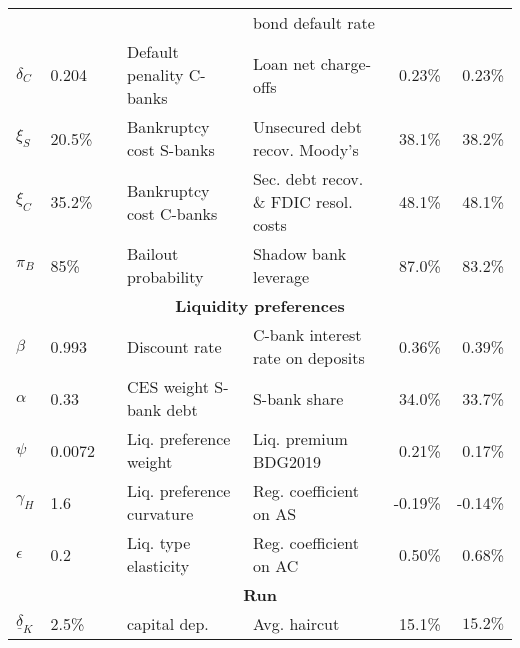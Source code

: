 \documentclass[letterpaper,12pt,dvipsnames,usenames]{article}
\theoremstyle{plain}
\begin{document}
\begin{table}[!ht]
{\begin{threeparttable}
\begin{tabular}{lllllrr}
				&  &    & &   bond default rate &   & \\
				$\delta_C$ & 0.204   &    &  Default penality C-banks  & Loan net charge-offs & 0.23\% &0.23\% \\
				$\xi_S$   & 20.5\%   &     & Bankruptcy cost S-banks  & Unsecured debt recov. Moody's & 38.1\%  & 38.2\% \\
				$\xi_C$   & 35.2\%    &    & Bankruptcy cost C-banks & Sec. debt recov. \& FDIC resol. costs & 48.1\%  & 48.1\% \\
				$\pi_B$   & 85\%      &  & Bailout probability    & Shadow bank leverage & 87.0\%  & 83.2\% \\ \midrule
				\multicolumn{7}{c}{\textbf{Liquidity preferences}} \\                  
				$\beta$  & 0.993    &    & Discount rate &  C-bank interest rate on deposits & 0.36\%  & 0.39\% \\   
				$\alpha$ & 0.33     &    & CES weight S-bank debt & S-bank share \citet*{gallin2013shadow} & 34.0\%  & 33.7\% \\    
				$\psi$     & 0.0072   &   & Liq. preference  weight  & Liq. premium BDG2019 & 0.21\% & 0.17\% \\   
				$\gamma_{H}$ &1.6&   & Liq. preference curvature & Reg. coefficient on AS & -0.19\% & -0.14\%\\ 
				$\epsilon$ & 0.2  &       & Liq. type elasticity & Reg. coefficient on AC & 0.50\% & 0.68\%\\ 
				\midrule
				\multicolumn{7}{c}{\textbf{Run}} \\      
				$\underline{\delta}_K $ & 2.5\%   &       & capital dep.   & Avg. haircut \citet*{gorton2009haircuts}                        & 15.1\% &$ 15.2\% $\\
				\bottomrule
			\end{tabular}
			\begin{tablenotes}[flushleft]
				\footnotesize
				\item %
			\end{tablenotes} 
	\end{threeparttable}}
\end{table} 
\end{document}
